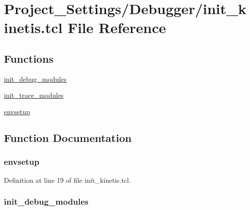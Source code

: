 \hypertarget{init__kinetis_8tcl}{}\section{Project\+\_\+\+Settings/\+Debugger/init\+\_\+kinetis.tcl File Reference}
\label{init__kinetis_8tcl}
\subsection*{Functions}
\begin{DoxyCompactItemize}
\item 
\hyperlink{init__kinetis_8tcl_a10c80471835dee84e7652764cecbb722}{init\+\_\+debug\+\_\+modules}
\item 
\hyperlink{init__kinetis_8tcl_a8ecf61d10da6f21c5b31426f9a235e03}{init\+\_\+trace\+\_\+modules}
\item 
\hyperlink{init__kinetis_8tcl_a7f6b4cebda44b6e9d42cc7879ee95e8e}{envsetup}
\end{DoxyCompactItemize}


\subsection{Function Documentation}
\subsubsection[{\texorpdfstring{envsetup}{envsetup}}]{\setlength{\rightskip}{0pt plus 5cm}envsetup}\hypertarget{init__kinetis_8tcl_a7f6b4cebda44b6e9d42cc7879ee95e8e}{}\label{init__kinetis_8tcl_a7f6b4cebda44b6e9d42cc7879ee95e8e}


Definition at line 19 of file init\+\_\+kinetis.\+tcl.

\subsubsection[{\texorpdfstring{init\+\_\+debug\+\_\+modules}{init_debug_modules}}]{\setlength{\rightskip}{0pt plus 5cm}init\+\_\+debug\+\_\+modules}\hypertarget{init__kinetis_8tcl_a10c80471835dee84e7652764cecbb722}{}\label{init__kinetis_8tcl_a10c80471835dee84e7652764cecbb722}


